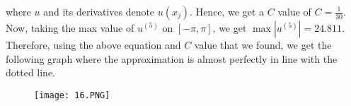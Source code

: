 \begin{solution}
    where $u$ and its derivatives denote $u(x_j)$. Hence, we get a $C$ value of $C=\frac{1}{30}$. Now,
    taking the max value of $u^{(5)}$ on $[-\pi,\pi]$, we get $\max|u^{(5)}|=24.811$. Therefore, using
    the above equation and $C$ value that we found, we get the following graph where the approximation
    is almost perfectly in line with the dotted line.

    \begin{figure}[htp]
        \centering
        \texttt{[image: 16.PNG]}
    \end{figure}

\end{solution}

\newpage

\newpage